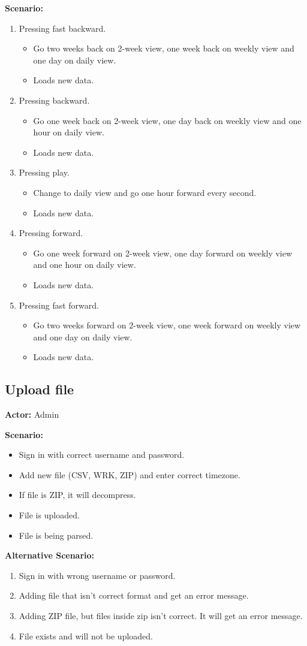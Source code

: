 \textbf{Scenario:}
\begin{enumerate}
\item Pressing fast backward.
\begin{itemize}
\item Go two weeks back on 2-week view, one week back on weekly view and one day on daily view.
\item Loads new data.
\end{itemize}
\item Pressing backward.
\begin{itemize}
\item Go one week back on 2-week view, one day back on weekly view and one hour on daily view.
\item Loads new data.
\end{itemize}
\item Pressing play.
\begin{itemize}
\item Change to daily view and go one hour forward every second.
\item Loads new data.
\end{itemize}
\item Pressing forward.
\begin{itemize}
\item Go one week forward on 2-week view, one day forward on weekly view and one hour on daily view.
\item Loads new data.
\end{itemize}
\item Pressing fast forward.
\begin{itemize}
\item Go two weeks forward on 2-week view, one week forward on weekly view and one day on daily view.
\item Loads new data.
\end{itemize}
\end{enumerate}

\subsection{Upload file}
\textbf{Actor:} Admin

\textbf{Scenario:}
\begin{itemize}
\item Sign in with correct username and password.
\item Add new file (CSV, WRK, ZIP) and enter correct timezone.
\item If file is ZIP, it will decompress.
\item File is uploaded.
\item File is being parsed.
\end{itemize}
\textbf{Alternative Scenario:} 
\begin{enumerate}
\item Sign in with wrong username or password.
\item Adding file that isn't correct format and get an error message.
\item Adding ZIP file, but files inside zip isn't correct. It will get an error message.
\item File exists and will not be uploaded.
\end{enumerate}